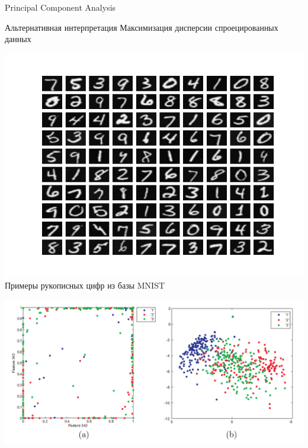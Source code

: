 \documentclass[10pt]{beamer}
\begin{document}
\begin{frame}{Principal Component Analysis}
    \begin{block}{Альтернативная интерпретация}
        Максимизация дисперсии спроецированных данных
    \end{block}
\begin{center}
    \includegraphics[scale=0.2]{images/digits.png}\\
    Примеры рукописных цифр из базы MNIST
\end{center}

\begin{center}
    \includegraphics[scale=0.2]{images/pcavsint.png}
\end{center}
\end{frame}
\end{document}
